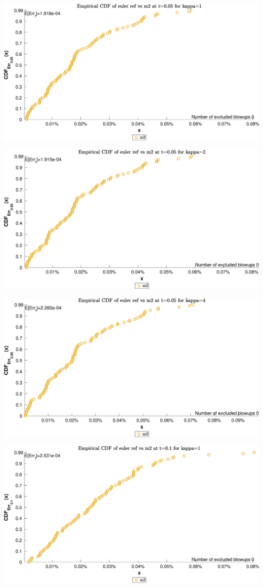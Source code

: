 \begin{landscape}
\includegraphics[width=.95\columnwidth]{CDF/CDFEulerRef_22}
\end{landscape}
\begin{landscape}
\includegraphics[width=.95\columnwidth]{CDF/CDFEulerRef_23}
\end{landscape}
\begin{landscape}
\includegraphics[width=.95\columnwidth]{CDF/CDFEulerRef_24}
\end{landscape}
\begin{landscape}
\includegraphics[width=.95\columnwidth]{CDF/CDFEulerRef_25}
\end{landscape}
